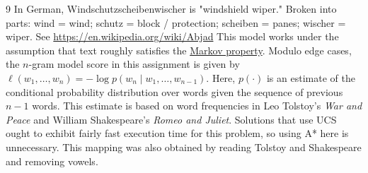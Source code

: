 \documentclass{article}
\theoremstyle{case}
\theoremstyle{definition}
\begin{document}
\newpage
\begin{thebibliography}{9}
In German, Windschutzscheibenwischer is "windshield wiper." Broken into parts: wind = wind; schutz = block / protection; scheiben = panes; wischer = wiper.
See \href{https://en.wikipedia.org/wiki/Abjad}{https://en.wikipedia.org/wiki/Abjad}
This model works under the assumption that text roughly satisfies the \href{https://en.wikipedia.org/wiki/Markov_property}{Markov property}.
Modulo edge cases, the $n$-gram model score in this assignment is
  given by $\ell(w_1, \ldots, w_n) = -\log p(w_n \mid w_1, \ldots,
  w_{n-1})$.  Here, $p(\cdot)$ is an estimate of the conditional
  probability distribution over words given the sequence of previous
  $n-1$ words. This estimate is based on word frequencies
  in Leo Tolstoy's \textit{War and Peace} and William
  Shakespeare's \textit{Romeo and Juliet}.
Solutions that use UCS ought to exhibit fairly fast execution time for this problem, so using A* here is unnecessary.
This mapping was also obtained by reading Tolstoy and Shakespeare and removing vowels.
\end{thebibliography}
\end{document}
